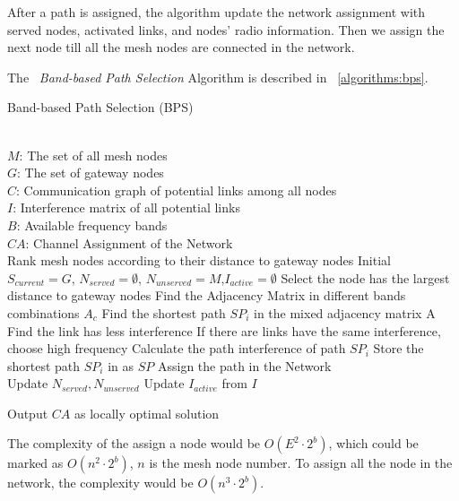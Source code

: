 After a path is assigned, the algorithm update the network assignment with served nodes, activated links, and nodes' radio information. Then we assign the next node till all the mesh nodes are connected in the network.

The ~\emph{Band-based Path Selection} Algorithm is described in ~\ref{algorithms:bps}.

\begin{algorithm}
    \small
\caption{Band-based Path Selection (BPS)}
\label{algorithms:bps}
\begin{algorithmic}[1]
\REQUIRE  ~~\\
	$M$: The set of all mesh nodes\\
	$G$: The set of gateway nodes\\
	$C$: Communication graph of potential links among all nodes\\
	$I$: Interference matrix of all potential links \\
	$B$: Available frequency bands
\ENSURE ~~\\    
$CA$: Channel Assignment of the Network\\
\STATE Rank mesh nodes according to their distance to gateway nodes
\STATE Initial $S_{current}=G$, $N_{served}=\emptyset$, $N_{unserved}=M$,$I_{active}=\emptyset$
\STATE Select the node has the largest distance to gateway nodes
\STATE Find the Adjacency Matrix in different bands combinations $A_c$
\STATE Find the shortest path $SP_i$ in the mixed adjacency matrix A 
\STATE Find the link has less interference
\STATE If there are links have the same interference, choose high frequency
\STATE Calculate the path interference of path $SP_i$
\ENDFOR
\STATE Store the shortest path $SP_i$ in as $SP$
\ENDFOR
\STATE Assign the path in the Network\\
		\STATE Update $N_{served},N_{unserved}$
		\STATE Update $I_{active}$ from $I$
\ENDWHILE 

Output $CA$ as locally optimal solution\\
\end{algorithmic}
\end{algorithm}

The complexity of the assign a node would be $O(E^2\cdot2^b)$, which could be marked as $O(n^2\cdot2^b)$, $n$ is the mesh node number.
 To assign all the node in the network, the complexity would be $O(n^3\cdot2^b)$.


